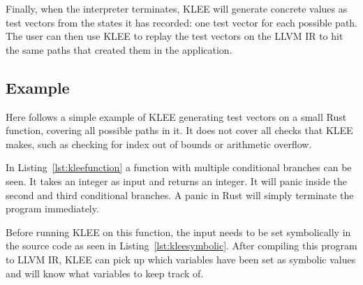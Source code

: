 Finally, when the interpreter terminates, KLEE will generate concrete values as
test vectors from the states it has recorded: one test vector for each possible
path. The user can then use KLEE to replay the test vectors on the LLVM IR to hit
the same paths that created them in the application.

\subsection{Example}
Here follows a simple example of KLEE generating test vectors on a small Rust
function, covering all possible paths in it. It does not cover all checks that
KLEE makes, such as checking for index out of bounds or arithmetic overflow.

In Listing~\ref{lst:kleefunction} a function with multiple conditional branches
can be seen. It takes an integer as input and returns an integer. It will
panic inside the second and third conditional branches. A panic in Rust will
simply terminate the program immediately.


Before running KLEE on this function, the input needs to be set symbolically in
the source code as seen in Listing~\ref{lst:kleesymbolic}. After compiling this
program to LLVM IR, KLEE can pick up which variables have been set as symbolic
values and will know what variables to keep track of.


